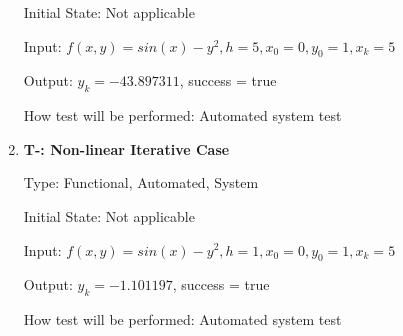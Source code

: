 \documentclass[12pt, titlepage]{article}
\newcounter{tnum} %
\begin{document}
\begin{enumerate}
Initial State: Not applicable
					
Input: $f(x, y) = sin(x) - y^2, h = 5, x_0 = 0, y_0 = 1, x_k = 5$
					
Output: $y_k = -43.897311$, success = true
					
How test will be performed: Automated system test

\item{\textbf{T-\thetnum \label{t-heun_nonlineariterative}: Non-linear Iterative Case}}

Type: Functional, Automated, System %
					
Initial State: Not applicable
					
Input: $f(x, y) = sin(x) - y^2, h = 1, x_0 = 0, y_0 = 1, x_k = 5$
					
Output: $y_k = -1.101197$, success = true
					
How test will be performed: Automated system test

\end{enumerate}
\end{document}
